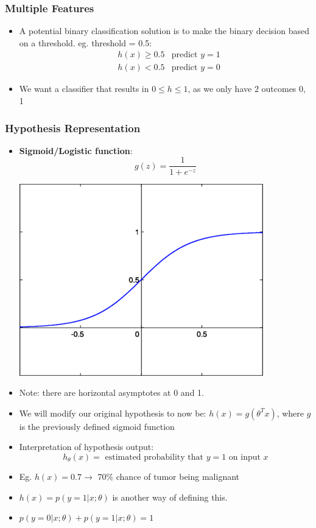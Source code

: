 \subsubsection{Multiple Features}
\begin{itemize}[--]
	\item A potential binary classification solution is to make the binary decision based on a threshold. eg. threshold = 0.5:
	\begin{align*}
		& h(x)\geq 0.5 & \text{predict } y = 1\\
		& h(x)< 0.5 & \text{predict }y = 0
	\end{align*}

	\item We want a classifier that results in $0\leq h\leq 1$, as we only have 2 outcomes 0, 1
\end{itemize}

\subsubsection{Hypothesis Representation}
\begin{itemize}[--]
	\item \textbf{Sigmoid/Logistic function}:
		$$g(z)=\frac{1}{1+e^{-z}}$$
	\begin{center}
		\includegraphics[scale=0.65]{sections/cs229/w3/sigmoid.png}
	\end{center}
	\item Note: there are horizontal asymptotes at 0 and 1.
	\item We will modify our original hypothesis to now be: $h(x)=g(\theta^{T}x)$, where $g$ is the previously defined sigmoid function
	\item Interpretation of hypothesis output: 
	$$h_\theta (x) = \text{ estimated probability that } y=1 \text{ on input } x$$
	\item Eg. $h(x)=0.7\to$ 70\% chance of tumor being malignant
	\item $h(x)=p(y=1|x;\theta)$ is another way of defining this.
	\item $p(y=0|x;\theta) + p(y=1|x;\theta) = 1$
\end{itemize}

